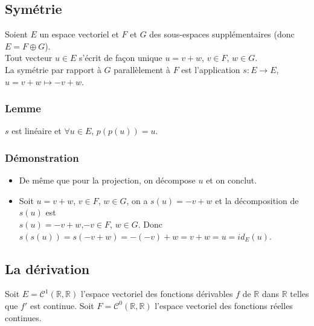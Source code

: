 \documentclass[a4paper,10pt]{book} %
\newcommand{\R}{\mathbb{R}}
\begin{document}
\subsection{Symétrie}\label{Symétrie}
Soient $E$ un espace vectoriel et $F$ et $G$ des sous-espaces supplémentaires (donc $E=F\oplus G$).\\
Tout vecteur $u\in E$ s'écrit de façon unique $u=v+w$, $v\in F$, $w\in G$.\\
La symétrie par rapport à $G$ parallèlement à $F$ est l'application $s:E\rightarrow E$, $u=v+w\mapsto -v+w$.

\begin{center}\end{center}

\subsubsection{Lemme}
$s$ est linéaire et $\forall u\in E$, $p(p(u))=u$.

\subsubsection{Démonstration}
\begin{itemize}
\item De même que pour la projection, on décompose $u$ et on conclut.
\item Soit $u=v+w$, $v\in F$, $w\in G$, on a $s(u)=-v+w$ et la décomposition de $s(u)$ est\\
$s(u)=-v+w$,$-v\in F$, $w\in G$. Donc $s(s(u))=s(-v+w)=-(-v)+w=v+w=u=id_E(u)$.
\end{itemize}

\subsection{La dérivation}
Soit $E=\mathcal{C}^1(\R,\R)$ l'espace vectoriel des fonctions dérivables $f$ de $\R$ dans $\R$ telles que $f'$ est continue. Soit $F=\mathcal{C}^0(\R,\R)$ l'espace vectoriel des fonctions réelles continues.\\
\end{document}
